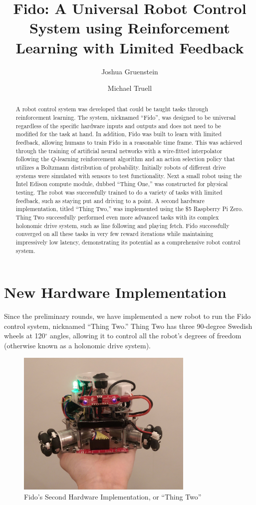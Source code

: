 \documentclass[letterpaper,11pt]{article}
\title{Fido: A Universal Robot Control System using Reinforcement Learning with Limited Feedback}
\author{Joshua Gruenstein \and Michael Truell}
\date{}
\begin{document}
	\maketitle

	\begin{abstract}
		A robot control system was developed that could be taught tasks through reinforcement learning.  The system, nicknamed ``Fido'', was designed to be universal regardless of the specific hardware inputs and outputs and does not need to be modified for the task at hand. In addition, Fido was built to learn with limited feedback, allowing humans to train Fido in a reasonable time frame. This was achieved through the training of artificial neural networks with a wire-fitted interpolator following the $Q$-learning reinforcement algorithm and an action selection policy that utilizes a Boltzmann distribution of probability.  Initially robots of different drive systems were simulated with sensors to test functionality.  Next a small robot using the Intel Edison compute module, dubbed ``Thing One,'' was constructed for physical testing.  The robot was successfully trained to do a variety of tasks with limited feedback, such as staying put and driving to a point.   A second hardware implementation, titled ``Thing Two,'' was implemented using the \$5 Raspberry Pi Zero.  Thing Two successfully performed even more advanced tasks with its complex holonomic drive system, such as line following and playing fetch. Fido successfully converged on all these tasks in very few reward iterations while maintaining impressively low latency, demonstrating its potential as a comprehensive robot control system.
	\end{abstract}

	\section*{New Hardware Implementation}

	Since the preliminary rounds, we have implemented a new robot to run the Fido control system, nicknamed ``Thing Two.''  Thing Two has three 90-degree Swedish wheels at 120$^{\circ}$ angles, allowing it to control all the robot's degrees of freedom (otherwise known as a holonomic drive system).

	\begin{figure}[ht]
		\centering
		\includegraphics[height=7cm]{ThingTwo.png}
		\caption{Fido's Second Hardware Implementation, or ``Thing Two''}
	\end{figure}
\end{document}
